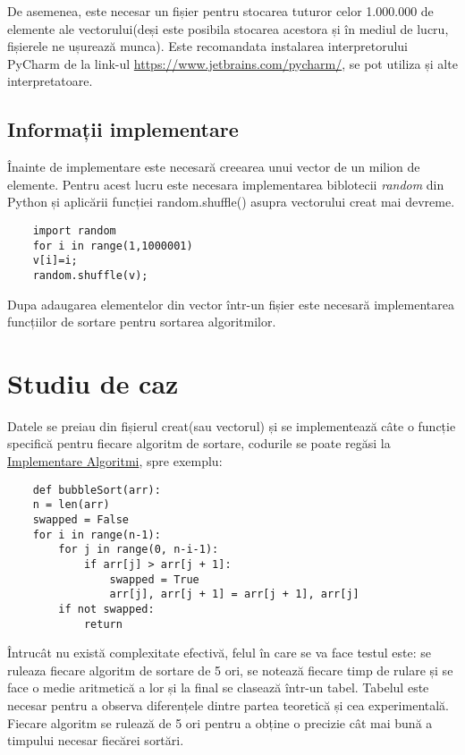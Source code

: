 \documentclass[12pt]{article}
\begin{document}
De asemenea, este necesar un fișier pentru stocarea tuturor celor 1.000.000 de elemente ale vectorului(deși este posibila stocarea acestora și în mediul de lucru, fișierele ne ușurează munca).
Este recomandata instalarea interpretorului PyCharm de la link-ul \url{https://www.jetbrains.com/pycharm/}, se pot utiliza și alte interpretatoare.
\subsection{Informații implementare}
\label{dific}
Înainte de implementare este necesară creearea unui vector de un milion de elemente. Pentru acest lucru este necesara implementarea biblotecii \emph{random} din Python și aplicării funcției random.shuffle() asupra vectorului creat mai devreme.
\begin{lstlisting}
    import random
    for i in range(1,1000001)
    v[i]=i;
    random.shuffle(v);
\end{lstlisting}
Dupa adaugarea elementelor din vector într-un fișier este necesară implementarea funcțiilor de sortare pentru sortarea algoritmilor.


\section{Studiu de caz}
\label{sec:studiudecaz}
Datele se preiau din fișierul creat(sau vectorul) și se implementează câte o funcție specifică pentru fiecare algoritm de sortare, codurile se poate regăsi la \href{https://github.com/stefearares}{Implementare Algoritmi}, spre exemplu:
\begin{lstlisting}
    def bubbleSort(arr):
    n = len(arr)
    swapped = False
    for i in range(n-1):
        for j in range(0, n-i-1):
            if arr[j] > arr[j + 1]:
                swapped = True
                arr[j], arr[j + 1] = arr[j + 1], arr[j]         
        if not swapped:
            return
\end{lstlisting}
Întrucât nu există complexitate efectivă, felul în care se va face testul este: se ruleaza fiecare algoritm de sortare de 5 ori, se notează fiecare timp de rulare și se face o medie aritmetică a lor și la final se clasează într-un tabel.
Tabelul este necesar pentru a observa diferențele dintre partea teoretică și cea experimentală.
Fiecare algoritm se rulează de 5 ori pentru a obține o precizie cât mai bună a timpului necesar fiecărei sortări.
\end{document}
